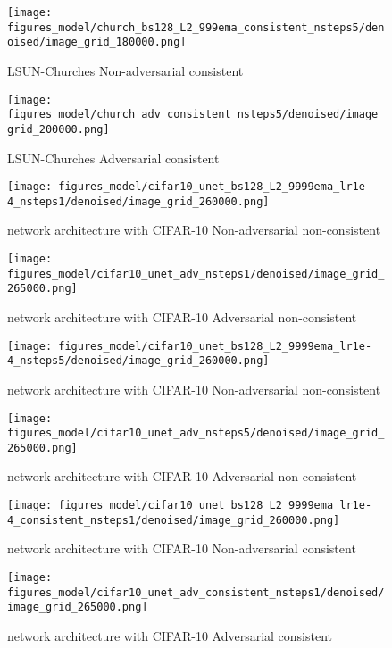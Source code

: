 \documentclass{article} \usepackage{iclr2021_conference_notitle,times}
\theoremstyle{definition}
\theoremstyle{definition}
\begin{document}
\begin{figure}[ht] 
    \centering
    \texttt{[image: figures\_model/church\_bs128\_L2\_999ema\_consistent\_nsteps5/denoised/image\_grid\_180000.png]}
    \caption{LSUN-Churches Non-adversarial consistent } 
\end{figure}
\begin{figure}[ht] 
    \centering
    \texttt{[image: figures\_model/church\_adv\_consistent\_nsteps5/denoised/image\_grid\_200000.png]}
    \caption{LSUN-Churches Adversarial consistent } 
\end{figure}



\begin{figure}[ht] 
    \centering
    \texttt{[image: figures\_model/cifar10\_unet\_bs128\_L2\_9999ema\_lr1e-4\_nsteps1/denoised/image\_grid\_260000.png]}
    \caption{\citet{ho2020denoising} network architecture with CIFAR-10 Non-adversarial non-consistent } 
\end{figure}
\begin{figure}[ht] 
    \centering
    \texttt{[image: figures\_model/cifar10\_unet\_adv\_nsteps1/denoised/image\_grid\_265000.png]}
    \caption{\citet{ho2020denoising} network architecture with CIFAR-10 Adversarial non-consistent } 
\end{figure}

\begin{figure}[ht] 
    \centering
    \texttt{[image: figures\_model/cifar10\_unet\_bs128\_L2\_9999ema\_lr1e-4\_nsteps5/denoised/image\_grid\_260000.png]}
    \caption{\citet{ho2020denoising} network architecture with CIFAR-10 Non-adversarial non-consistent } 
\end{figure}
\begin{figure}[ht] 
    \centering
    \texttt{[image: figures\_model/cifar10\_unet\_adv\_nsteps5/denoised/image\_grid\_265000.png]}
    \caption{\citet{ho2020denoising} network architecture with CIFAR-10 Adversarial non-consistent } 
\end{figure}

\begin{figure}[ht] 
    \centering
    \texttt{[image: figures\_model/cifar10\_unet\_bs128\_L2\_9999ema\_lr1e-4\_consistent\_nsteps1/denoised/image\_grid\_260000.png]}
    \caption{\citet{ho2020denoising} network architecture with CIFAR-10 Non-adversarial consistent } 
\end{figure}
\begin{figure}[ht] 
    \centering
    \texttt{[image: figures\_model/cifar10\_unet\_adv\_consistent\_nsteps1/denoised/image\_grid\_265000.png]}
    \caption{\citet{ho2020denoising} network architecture with CIFAR-10 Adversarial consistent } 
\end{figure}
\end{document}
